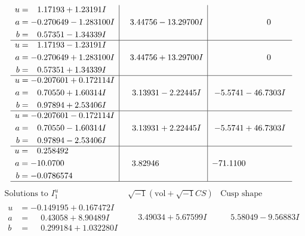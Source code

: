 \documentclass[1p]{elsarticle_modified}
\theoremstyle{definition}
\newcommand{\I}{\sqrt{-1}}
\begin{document}
$$\begin{array}{c|c|c}
\begin{aligned}
u &= \phantom{-}1.17193 + 1.23191 I \\
a &= -0.270649 - 1.283100 I \\
b &= \phantom{-}0.57351 - 1.34339 I\end{aligned}
 & \phantom{-}3.44756 - 13.29700 I & \phantom{-0.000000 } 0 \\ \hline\begin{aligned}
u &= \phantom{-}1.17193 - 1.23191 I \\
a &= -0.270649 + 1.283100 I \\
b &= \phantom{-}0.57351 + 1.34339 I\end{aligned}
 & \phantom{-}3.44756 + 13.29700 I & \phantom{-0.000000 } 0 \\ \hline\begin{aligned}
u &= -0.207601 + 0.172114 I \\
a &= \phantom{-}0.70550 + 1.60314 I \\
b &= \phantom{-}0.97894 + 2.53406 I\end{aligned}
 & \phantom{-}3.13931 - 2.22445 I & -5.5741 - 46.7303 I \\ \hline\begin{aligned}
u &= -0.207601 - 0.172114 I \\
a &= \phantom{-}0.70550 - 1.60314 I \\
b &= \phantom{-}0.97894 - 2.53406 I\end{aligned}
 & \phantom{-}3.13931 + 2.22445 I & -5.5741 + 46.7303 I \\ \hline\begin{aligned}
u &= \phantom{-}0.258492\phantom{ +0.000000I} \\
a &= -10.0700\phantom{ +0.000000I} \\
b &= -0.0786574\phantom{ +0.000000I}\end{aligned}
 & \phantom{-}3.82946\phantom{ +0.000000I} & -71.1100\phantom{ +0.000000I}\\
 \hline 
 \end{array}$$\newpage$$\begin{array}{c|c|c}  
\text{Solutions to }I^u_{1}& \I (\text{vol} + \sqrt{-1}CS) & \text{Cusp shape}\\
 \hline 
\begin{aligned}
u &= -0.149195 + 0.167472 I \\
a &= \phantom{-}0.43058 + 8.90489 I \\
b &= \phantom{-}0.299184 + 1.032280 I\end{aligned}
 & \phantom{-}3.49034 + 5.67599 I & \phantom{-}5.58049 - 9.56883 I \\ \hline\begin{aligned}

\end{aligned}
\end{array}$$
\end{document}
